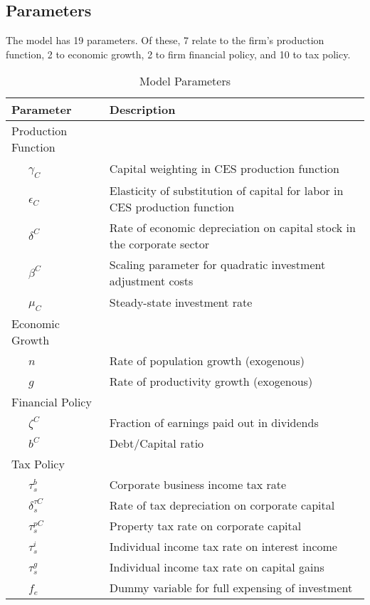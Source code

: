 \subsection{Parameters}

The model has 19 parameters.  Of these, 7 relate to the firm's production function, 2 to economic growth, 2 to firm financial policy, and 10 to tax policy.

\begin{table}[htbp]
  \centering
  \caption{Model Parameters}
    \begin{tabular}{ll}
    \hline
    \hline
    Parameter & Description \\
    \hline
    Production Function &  \\
    \ \ \ $\gamma_{C}$ & Capital weighting in CES production function \\
    \ \ \ $\epsilon_{C}$ & Elasticity of substitution of capital for labor in CES production function \\
    \ \ \ $\delta^{C}$ & Rate of economic depreciation on capital stock in the corporate sector \\
    \ \ \ $\beta^{C}$ & Scaling parameter for quadratic investment adjustment costs \\
    \ \ \ $\mu_{C}$ & Steady-state investment rate \\
    Economic Growth &  \\
    \ \ \ $n$ & Rate of population growth (exogenous) \\
    \ \ \ $g$ & Rate of productivity growth (exogenous) \\
    Financial Policy &  \\
    \ \ \ $\zeta^{C}$ & Fraction of earnings paid out in dividends \\
    \ \ \ $b^{C}$ & Debt/Capital ratio \\
    Tax Policy &  \\
    \ \ \ $\tau^{b}_{s}$ & Corporate business income tax rate \\
    \ \ \ $\delta^{\tau C}_{s}$ & Rate of tax depreciation on corporate capital \\
    \ \ \ $\tau^{pC}_{s}$ & Property tax rate on corporate capital \\
    \ \ \ $\tau^{i}_{s}$ & Individual income tax rate on interest income \\
    \ \ \ $\tau^{g}_{s}$ & Individual income tax rate on capital gains \\
    \ \ \ $f_{e}$ & Dummy variable for full expensing of investment  \\

\end{tabular}
\end{table}
